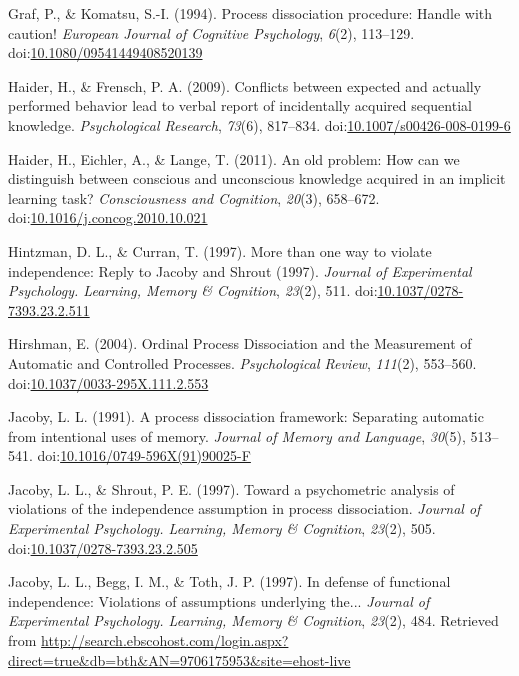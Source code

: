 \documentclass[man]{apa6}
\theoremstyle{definition}
\theoremstyle{definition}
\theoremstyle{definition}
\theoremstyle{remark}
\begin{document}
\hypertarget{ref-graf_process_1994}{}
Graf, P., \& Komatsu, S.-I. (1994). Process dissociation procedure:
Handle with caution! \emph{European Journal of Cognitive Psychology},
\emph{6}(2), 113--129.
doi:\href{https://doi.org/10.1080/09541449408520139}{10.1080/09541449408520139}

\hypertarget{ref-haider_conflicts_2009}{}
Haider, H., \& Frensch, P. A. (2009). Conflicts between expected and
actually performed behavior lead to verbal report of incidentally
acquired sequential knowledge. \emph{Psychological Research},
\emph{73}(6), 817--834.
doi:\href{https://doi.org/10.1007/s00426-008-0199-6}{10.1007/s00426-008-0199-6}

\hypertarget{ref-haider_old_2011}{}
Haider, H., Eichler, A., \& Lange, T. (2011). An old problem: How can we
distinguish between conscious and unconscious knowledge acquired in an
implicit learning task? \emph{Consciousness and Cognition},
\emph{20}(3), 658--672.
doi:\href{https://doi.org/10.1016/j.concog.2010.10.021}{10.1016/j.concog.2010.10.021}

\hypertarget{ref-hintzman_more_1997}{}
Hintzman, D. L., \& Curran, T. (1997). More than one way to violate
independence: Reply to Jacoby and Shrout (1997). \emph{Journal of
Experimental Psychology. Learning, Memory \& Cognition}, \emph{23}(2),
511.
doi:\href{https://doi.org/10.1037/0278-7393.23.2.511}{10.1037/0278-7393.23.2.511}

\hypertarget{ref-hirshman_ordinal_2004}{}
Hirshman, E. (2004). Ordinal Process Dissociation and the Measurement of
Automatic and Controlled Processes. \emph{Psychological Review},
\emph{111}(2), 553--560.
doi:\href{https://doi.org/10.1037/0033-295X.111.2.553}{10.1037/0033-295X.111.2.553}

\hypertarget{ref-jacoby_process_1991}{}
Jacoby, L. L. (1991). A process dissociation framework: Separating
automatic from intentional uses of memory. \emph{Journal of Memory and
Language}, \emph{30}(5), 513--541.
doi:\href{https://doi.org/10.1016/0749-596X(91)90025-F}{10.1016/0749-596X(91)90025-F}

\hypertarget{ref-jacoby_toward_1997}{}
Jacoby, L. L., \& Shrout, P. E. (1997). Toward a psychometric analysis
of violations of the independence assumption in process dissociation.
\emph{Journal of Experimental Psychology. Learning, Memory \&
Cognition}, \emph{23}(2), 505.
doi:\href{https://doi.org/10.1037/0278-7393.23.2.505}{10.1037/0278-7393.23.2.505}

\hypertarget{ref-jacoby_defense_1997}{}
Jacoby, L. L., Begg, I. M., \& Toth, J. P. (1997). In defense of
functional independence: Violations of assumptions underlying the...
\emph{Journal of Experimental Psychology. Learning, Memory \&
Cognition}, \emph{23}(2), 484. Retrieved from
\url{http://search.ebscohost.com/login.aspx?direct=true\&db=bth\&AN=9706175953\&site=ehost-live}
\end{document}
